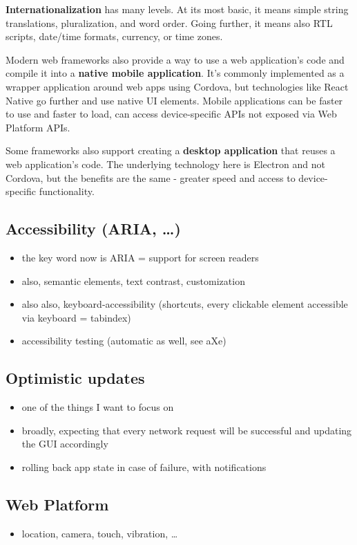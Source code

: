 \documentclass[english,odsaz]{fitthesis}
\begin{document}
\textbf{Internationalization} has many levels. At its most basic, it means simple string
translations, pluralization, and word order. Going further, it means also RTL
scripts, date/time formats, currency, or time zones.

Modern web frameworks also provide a way to use a web application's code and
compile it into a \textbf{native mobile application}. It's commonly implemented as a
wrapper application around web apps using Cordova, but technologies like React
Native go further and use native UI elements. Mobile applications can be faster
to use and faster to load, can access device-specific APIs not exposed via Web
Platform APIs.

Some frameworks also support creating a \textbf{desktop application} that reuses a web
application's code. The underlying technology here is Electron and not Cordova,
but the benefits are the same - greater speed and access to device-specific
functionality.

\subsection{Accessibility (ARIA, \ldots{})}
\label{sec:orgc1fdb11}
\begin{itemize}
\item the key word now is ARIA = support for screen readers
\item also, semantic elements, text contrast, customization
\item also also, keyboard-accessibility (shortcuts, every clickable element
accessible via keyboard = tabindex)
\item accessibility testing (automatic as well, see aXe)
\end{itemize}

\subsection{Optimistic updates}
\label{sec:org22f479c}
\begin{itemize}
\item one of the things I want to focus on
\item broadly, expecting that every network request will be successful and updating
the GUI accordingly
\item rolling back app state in case of failure, with notifications
\end{itemize}

\subsection{Web Platform}
\label{sec:org8a17782}
\begin{itemize}
\item location, camera, touch, vibration, \ldots{}
\end{itemize}
\end{document}
